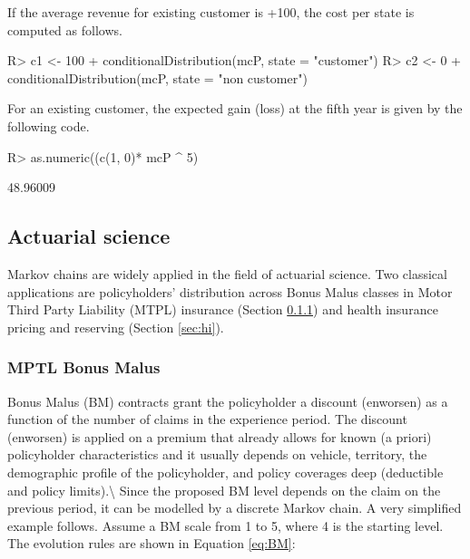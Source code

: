 \documentclass[
  nojss]{jss}
\begin{document}
If the average revenue for existing customer is +100, the cost per state is computed as follows.

\begin{CodeChunk}

\begin{CodeInput}
R> c1 <- 100 + conditionalDistribution(mcP, state = "customer") %
R> c2 <- 0 + conditionalDistribution(mcP, state = "non customer") %
\end{CodeInput}
\end{CodeChunk}

For an existing customer, the expected gain (loss) at the fifth year is given by the following code.

\begin{CodeChunk}

\begin{CodeInput}
R> as.numeric((c(1, 0)* mcP ^ 5) %
\end{CodeInput}

\begin{CodeOutput}
[1] 48.96009
\end{CodeOutput}
\end{CodeChunk}

\hypertarget{app:act}{%
\subsection{Actuarial science}\label{app:act}}

Markov chains are widely applied in the field of actuarial science. Two
classical applications are policyholders' distribution across Bonus Malus
classes in Motor Third Party Liability (MTPL) insurance (Section \ref{sec:bm}) and health insurance pricing and reserving
(Section \ref{sec:hi}).

\hypertarget{sec:bm}{%
\subsubsection{MPTL Bonus Malus}\label{sec:bm}}

Bonus Malus (BM) contracts grant the policyholder a discount (enworsen) as a function of the number of claims in the experience period. The discount (enworsen) is applied on a premium that already allows for known (a priori) policyholder characteristics \citep{denuit2007actuarial} and it usually depends on vehicle, territory, the demographic profile of the policyholder, and policy coverages deep (deductible and policy limits).\textbackslash{}
Since the proposed BM level depends on the claim on the previous period, it can be modelled by a discrete Markov chain. A very simplified example follows. Assume a BM scale from 1 to 5, where 4 is the starting level. The evolution rules are shown in Equation \ref{eq:BM}:
\end{document}
